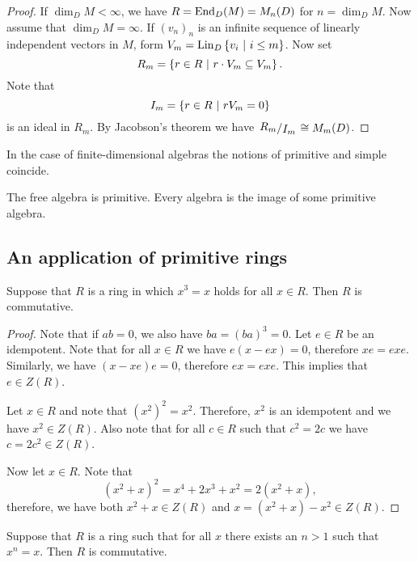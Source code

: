 \begin{proof}
If $\dim_D M < \infty$, we have $R = \operatorname{End}_D(M) = M_n(D)$ for
$n = \dim_D M$. Now assume that $\dim_D M = \infty$. If
$(v_n)_n$ is an infinite sequence of linearly independent vectors
in $M$, form $V_m = \operatorname{Lin}_D \left\{v_i~\middle\vert~i \leq m\right\}$. Now set
\[
R_m = \left\{r \in R~\middle\vert~r \cdot V_m \subseteq V_m\right\}.
\]
Note that
\[
I_m = \left\{r \in R~\middle\vert~r V_m = 0\right\}
\]
is an ideal in $R_m$. By Jacobson's theorem we have
$\kvoc{R_m}{I_m} \cong M_m(D)$.
\end{proof}

\begin{opomba}
In the case of finite-dimensional algebras the notions of primitive
and simple coincide.
\end{opomba}

\begin{opomba}
The free algebra is primitive. Every algebra is the image of some
primitive algebra.
\end{opomba}

\newpage

\subsection{An application of primitive rings}

\begin{trditev}
Suppose that $R$ is a ring in which $x^3 = x$ holds for all
$x \in R$. Then $R$ is commutative.
\end{trditev}

\begin{proof}
Note that if $ab = 0$, we also have $ba = (ba)^3 = 0$. Let
$e \in R$ be an idempotent. Note that for all $x \in R$ we have
$e (x - ex) = 0$, therefore $xe = exe$. Similarly, we have
$(x - xe) e = 0$, therefore $ex = exe$. This implies that
$e \in Z(R)$.

Let $x \in R$ and note that $(x^2)^2 = x^2$. Therefore, $x^2$ is an
idempotent and we have $x^2 \in Z(R)$. Also note that for all
$c \in R$ such that $c^2 = 2c$ we have $c = 2c^2 \in Z(R)$.

Now let $x \in R$. Note that
\[
(x^2 + x)^2 = x^4 + 2x^3 + x^2 = 2(x^2 + x),
\]
therefore, we have both $x^2 + x \in Z(R)$ and
$x = (x^2 + x) - x^2 \in Z(R)$.
\end{proof}

\begin{izrek}[Jacobson]
Suppose that $R$ is a ring such that for all $x$ there exists an
$n > 1$ such that $x^n = x$. Then $R$ is commutative.
\end{izrek}

